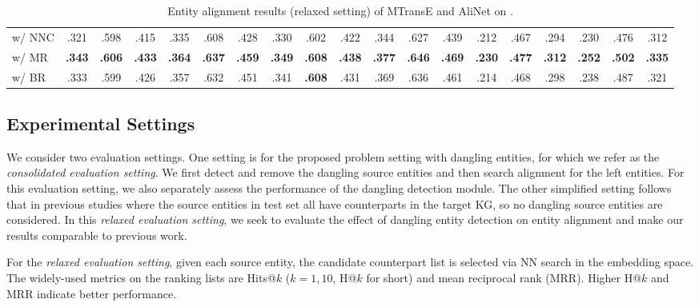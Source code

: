 \begin{table*}[!t]
{\begin{tabular}{lcccccccccccccccccc}
\;\;w/ NNC & .321 & .598 & .415 & .335 & .608 & .428 & .330 & .602 & .422 & .344 & .627 & .439 & .212 & .467 & .294 & .230 & .476 & .312 \\
\;\;w/ MR & \textbf{.343} & \textbf{.606} & \textbf{.433} & \textbf{.364} & \textbf{.637} & \textbf{.459} & \textbf{.349} & \textbf{.608} & \textbf{.438} & \textbf{.377} & \textbf{.646} & \textbf{.469} & \textbf{.230} & \textbf{.477} & \textbf{.312} & \textbf{.252} & \textbf{.502} & \textbf{.335}\\
\;\;w/ BR & .333 & .599 & .426 & .357 & .632 & .451 & .341 & \textbf{.608} & .431 & .369 & .636 & .461 & .214 & .468 & .298 & .238 & .487 & .321 \\
			\bottomrule
	\end{tabular}}
	\caption{Entity alignment results (relaxed setting) of MTransE and AliNet on \dataset.}
	\label{tab:synthetic_ent_alignment}
\end{table*}

\subsection{Experimental Settings}\label{sec:setting}
We consider two evaluation settings. 
One setting is for the proposed problem setting with dangling entities, for which we refer as the \emph{consolidated evaluation setting}. 
We first detect and remove the dangling source entities and then search alignment for the left entities.
For this evaluation setting, we also separately assess the performance of the dangling detection module.
The other simplified setting follows that in previous studies \cite{JAPE,OpenEA} where the source entities in test set all have counterparts in the target KG, so no dangling source entities are considered. 
In this \emph{relaxed evaluation setting}, we seek to evaluate the effect of dangling entity detection on entity alignment and make our results comparable to previous work. 

For the \emph{relaxed evaluation setting}, given each source entity, the candidate counterpart list is selected via NN search in the embedding space. 
The widely-used metrics on the ranking lists are Hits@$k$ ($k=1,10$, H@$k$ for short) and mean reciprocal rank (MRR).
Higher H@$k$ and MRR indicate better performance.

